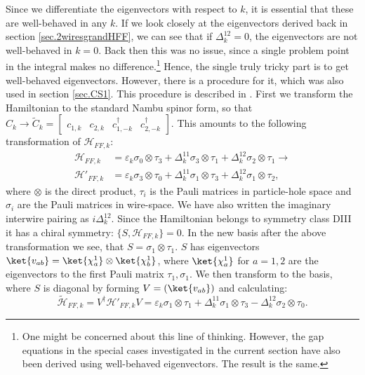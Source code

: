 Since we differentiate the eigenvectors with respect to $k$, it is essential that these are well-behaved in any $k$. If we look closely at the eigenvectors derived back in section \ref{sec.2wiresgrandHFF}, we can see that if $\Delta^{12}_k = 0$, the eigenvectors are not well-behaved in $k = 0$. Back then this was no issue, since a single problem point in the integral makes no difference.\footnote{One might be concerned about this line of thinking. However, the gap equations in the special cases investigated in the current section have also been derived using well-behaved eigenvectors. The result is the same.} Hence, the single truly tricky part is to get well-behaved eigenvectors. However, there is a procedure for it, which was also used in section \ref{sec.CS1}. This procedure is described in \cite{Ryu.Topology}. First we transform the Hamiltonian to the standard Nambu spinor form, so that $C_k \to \tilde{C}_k = \begin{bmatrix} c_{1,k} & c_{2,k} & c^\dagger_{1,-k} & c^\dagger_{2,-k}  \end{bmatrix}$. This amounts to the following transformation of $\mathcal{H}_{FF,k}$:
\begin{align}
\mathcal{H}_{FF,k} &= \varepsilon_k \sigma_0 \otimes \tau_3 + \Delta^{11}_k \sigma_3 \otimes \tau_1 + \Delta^{12}_k \sigma_2 \otimes \tau_1 \to \nonumber \\
\mathcal{H}'_{FF,k} &= \varepsilon_k \sigma_3 \otimes \tau_0 + \Delta^{11}_k \sigma_1 \otimes \tau_3 + \Delta^{12}_k \sigma_1 \otimes \tau_2, \nonumber 
\end{align}
where $\otimes$ is the direct product, $\tau_i$ is the Pauli matrices in particle-hole space and $\sigma_i$ are the Pauli matrices in wire-space. We have also written the imaginary interwire pairing as $i\Delta^{12}_k$. Since the Hamiltonian belongs to symmetry class DIII it has a chiral symmetry: $\{S, \mathcal{H}_{FF,k}\} = 0$. In the new basis after the above transformation we see, that $S = \sigma_1\otimes \tau_1$. $S$ has eigenvectors $\ket{v_{ab}} = \ket{\chi^{1}_a}\otimes \ket{\chi^{1}_b}$, where $\ket{\chi^{1}_a}$ for $a = 1,2$ are the eigenvectors to the first Pauli matrix $\tau_1, \sigma_1$. We then transform to the basis, where $S$ is diagonal by forming $V = (\ket{v_{ab}})$ and calculating:
\begin{equation}
\tilde{\mathcal{H}}_{FF,k} = V^\dagger\mathcal{H}'_{FF,k}V = \varepsilon_k \sigma_1\otimes \tau_1 + \Delta^{11}_k \sigma_1\otimes\tau_3 - \Delta^{12}_k\sigma_2\otimes\tau_0. \nonumber 
\end{equation}
